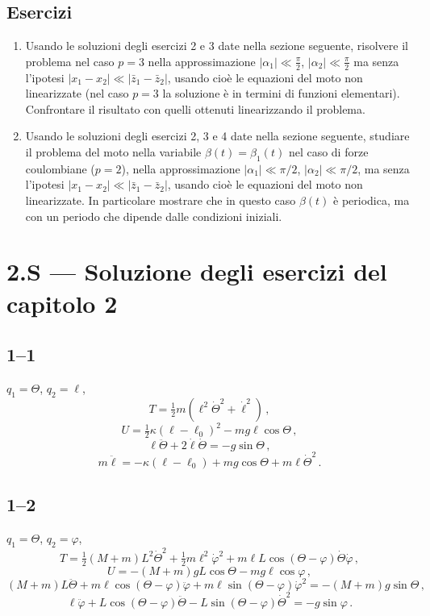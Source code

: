 \documentclass[11pt, a4paper]{book}
\numberwithin{equation}{section}
\newenvironment{esercizi}{\subsection*{Esercizi}\begin{enumerate}}{\end{enumerate}}
\begin{document}
\begin{esercizi}
    oscillazione sono del tutto indipendenti da $m_1$ ed $m_2$ (per ragioni
    dimensionali, potrebbero al più dipendere dal rapporto $m_1/m_2$). Queste
    proprietà sono dovute al fatto che la legge di forza fra i due punti
    materiali è di tipo coulombiano?
    \item[*] Usando le soluzioni degli esercizi 2 e 3 date nella sezione
    seguente, risolvere il problema nel caso $p=3$ nella approssimazione
    $|\alpha_1| \ll \frac{\pi}{2}$, $|\alpha_2| \ll \frac{\pi}{2}$ ma senza l'ipotesi
    $|x_1 - x_2| \ll |\bar{z}_1 - \bar{z}_2|$, usando cioè le equazioni del
    moto non linearizzate (nel caso $p=3$ la soluzione è in termini di funzioni
    elementari). Confrontare il risultato con quelli ottenuti linearizzando il
    problema.
    \item[*] Usando le soluzioni degli esercizi 2, 3 e 4 date nella sezione
    seguente, studiare il problema del moto nella variabile $\beta(t) = \beta_1(t)$
    nel caso di forze coulombiane ($p=2$), nella approssimazione
    $|\alpha_1| \ll \pi/2$, $|\alpha_2| \ll \pi/2$, ma senza l'ipotesi
    $|x_1 - x_2| \ll |\bar{z}_1 - \bar{z}_2|$, usando cioè le equazioni del moto
    non linearizzate. In particolare mostrare che in questo caso $\beta(t)$ è
    periodica, ma con un periodo che dipende dalle condizioni iniziali.
\end{esercizi}


\section*{2.S --- Soluzione degli esercizi del capitolo 2}

\subsection*{1--1}
$q_1 = \Theta$, $q_2 = \ell$,
\[
    T = \tfrac{1}{2}m(\ell^2\dot{\Theta}^2 + \dot{\ell}^2) \,,
\]
\[
    U = \tfrac{1}{2}\kappa(\ell-\ell_0)^2 - mg\ell\cos\Theta \,,
\]
\[
    \ell\ddot{\Theta} + 2\dot{\ell}\dot{\Theta} = -g\sin\Theta \,,
\]
\[
    m\ddot{\ell} = -\kappa(\ell-\ell_0) + mg\cos\Theta + m\ell\dot{\Theta}^2 \,.
\]

\subsection*{1--2}
$q_1 = \Theta$, $q_2 = \varphi$,
\[
    T = \tfrac{1}{2}(M+m)L^2\dot{\Theta}^2 + \tfrac{1}{2}m\ell^2\dot{\varphi}^2
    + m\ell L\cos(\Theta-\varphi)\dot{\Theta}\dot{\varphi} \,,
\]
\[
    U = -(M+m)gL\cos\Theta - mg\ell\cos\varphi \,,
\]
\[
    (M+m)L\ddot{\Theta} + m\ell\cos(\Theta-\varphi)\ddot{\varphi}
    + m\ell\sin(\Theta-\varphi)\dot{\varphi}^2 = -(M+m)g\sin\Theta \,,
\]
\[
    \ell\ddot{\varphi} + L\cos(\Theta-\varphi)\ddot{\Theta}
    - L\sin(\Theta-\varphi)\dot{\Theta}^2 = -g\sin\varphi \,.
\]
\end{document}
